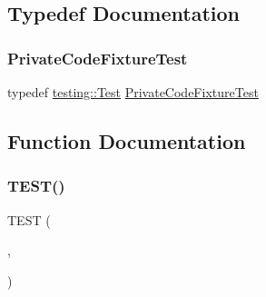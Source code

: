\subsection{Typedef Documentation}
\mbox{\label{_obj__test_2lib_2googletest-master_2googletest_2test_2gtest__prod__test_8cc_a89debba10c803e339ce0f9b0b34a2267}} 
\subsubsection{\texorpdfstring{PrivateCodeFixtureTest}{PrivateCodeFixtureTest}}
{\footnotesize\ttfamily typedef \mbox{\hyperlink{classtesting_1_1_test}{testing\+::\+Test}} \mbox{\hyperlink{googletest-master_2googletest_2test_2gtest__prod__test_8cc_a89debba10c803e339ce0f9b0b34a2267}{Private\+Code\+Fixture\+Test}}}



\subsection{Function Documentation}
\mbox{\label{_obj__test_2lib_2googletest-master_2googletest_2test_2gtest__prod__test_8cc_a8e307a199011c2979d4a63464d245f4a}} 
\subsubsection{\texorpdfstring{TEST()}{TEST()}}
{\footnotesize\ttfamily T\+E\+ST (\begin{DoxyParamCaption}\item[{Private\+Code\+Test}]{,  }\item[{Can\+Access\+Private\+Members}]{ }\end{DoxyParamCaption})}

\mbox{\label{_obj__test_2lib_2googletest-master_2googletest_2test_2gtest__prod__test_8cc_a5e21e7e8dd53f2de05e9e6941b6612d3}} 

